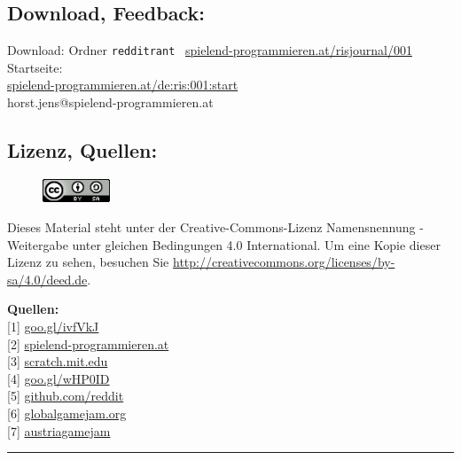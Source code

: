 \documentclass[10pt,a4paper,ngerman,twoside]{article} %
\newcommand{\SepRule}{\noindent	%
\begin{center}
\rule{250pt}{1pt} %
\end{center}
}
\begin{document}
\begin{multicols}{3}
\subsection*{Download, Feedback:}
\footnotesize{
Download: Ordner \texttt{redditrant} \Mundus\ \href{http://spielend-programmieren.at/risjournal/001}{spielend-programmieren.at/risjournal/001}\\
Startseite:\\
\href{http://spielend-programmieren.at/de:ris:001:start}{spielend-programmieren.at/de:ris:001:start}\\ 
\Letter\: horst.jens@spielend-programmieren.at\\}
\normalsize 


\subsection*{Lizenz, Quellen:}
\begin{figure}
\includegraphics[width=2cm]{redditrant/ccbysa88x31.png} 
\end{figure}
Dieses Material steht unter der Creative-Commons-Lizenz Namensnennung - Weitergabe unter gleichen Bedingungen 4.0 International. Um eine Kopie dieser Lizenz zu sehen, besuchen Sie \url{http://creativecommons.org/licenses/by-sa/4.0/deed.de}.

\textbf{Quellen:} \\
{[}1{]} \href{http://www.reddit.com/r/gamedev/comments/z83h2/the_games_industry_is_a_scam_and_this_is_why_you}{goo.gl/ivfVkJ} \\
{[}2{]} \href{http://spielend-programmieren.at}{spielend-programmieren.at} \\
{[}3{]} \href{http://scratch.mit.edu/}{scratch.mit.edu} \\
{[}4{]} \href{http://spielend-programmieren.at/de:mailinglist}{goo.gl/wHP0ID} \\
{[}5{]} \href{http://github.com/reddit/}{github.com/reddit} \\
{[}6{]} \href{http://globalgamejam.org/}{globalgamejam.org} \\
{[}7{]} \href{http://austriagamejam.org/}{austriagamejam} 

\end{multicols}
\SepRule
\end{document}
